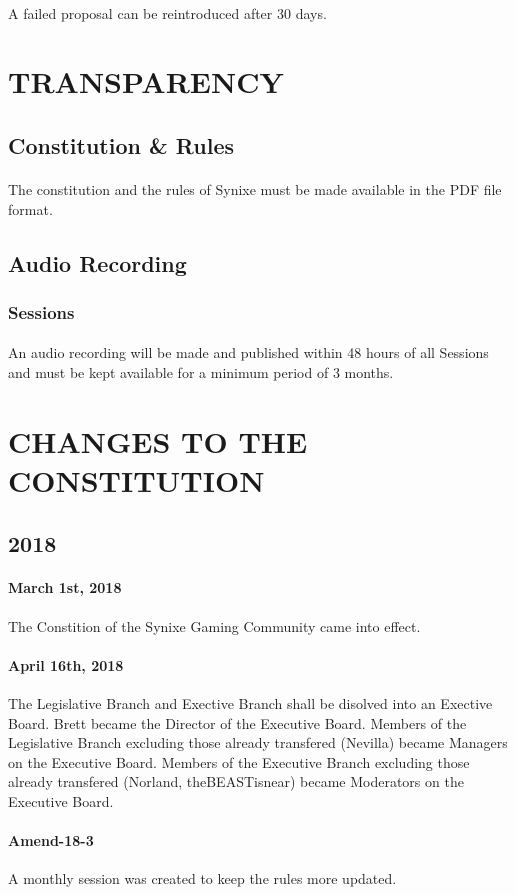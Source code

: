 \documentclass[10pt,a4paper]{article}
\begin{document}
\paragraph{}
A failed proposal can be reintroduced after 30 days.
\section{TRANSPARENCY}
\subsection{Constitution \& Rules}
\paragraph{}
The constitution and the rules of Synixe must be made available in the PDF file format.
\subsection{Audio Recording}
\subsubsection{Sessions}
\paragraph{}
An audio recording will be made and published within 48 hours of all Sessions and must be kept available for a minimum period of 3 months.
\section{CHANGES TO THE CONSTITUTION}
\subsection{2018}
\paragraph{March 1st, 2018}
The Constition of the Synixe Gaming Community came into effect.
\paragraph{April 16th, 2018}
The Legislative Branch and Exective Branch shall be disolved into an Exective Board. Brett became the Director of the Executive Board. Members of the Legislative Branch excluding those already transfered (Nevilla) became Managers on the Executive Board. Members of the Executive Branch excluding those already transfered (Norland, theBEASTisnear) became Moderators on the Executive Board.
\paragraph{Amend-18-3}
A monthly session was created to keep the rules more updated.
\end{document}

